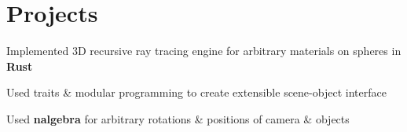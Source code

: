 \documentclass[]{chandan-cv}
\begin{document}
\begin{minipage}[t]{0.75\textwidth}



\section{Projects}

\descript{ }
\location{ }
\begin{tightemize}
	\item Implemented 3D recursive ray tracing engine for arbitrary materials on spheres in \textbf{Rust}
	\item Used traits \& modular programming to create extensible scene-object interface
	\item Used \textbf{nalgebra} for arbitrary rotations \& positions of camera \& objects 
\end{tightemize}
\sectionsep


\end{minipage}
\end{document}
